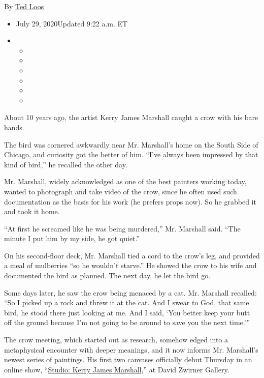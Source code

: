 By \href{https://www.nytimes.com/by/ted-loos}{Ted Loos}

\begin{itemize}
\item
  July 29, 2020Updated 9:22 a.m. ET
\item
  \begin{itemize}
  \item
  \item
  \item
  \item
  \item
  \item
  \end{itemize}
\end{itemize}

About 10 years ago, the artist Kerry James Marshall caught a crow with
his bare hands.

The bird was cornered awkwardly near Mr. Marshall's home on the South
Side of Chicago, and curiosity got the better of him. ``I've always been
impressed by that kind of bird,'' he recalled the other day.

Mr. Marshall, widely acknowledged as one of the best painters working
today, wanted to photograph and take video of the crow, since he often
used such documentation as the basis for his work (he prefers props
now). So he grabbed it and took it home.

``At first he screamed like he was being murdered,'' Mr. Marshall said.
``The minute I put him by my side, he got quiet.''

On his second-floor deck, Mr. Marshall tied a cord to the crow's leg,
and provided a meal of mulberries ``so he wouldn't starve.'' He showed
the crow to his wife and documented the bird as planned. The next day,
he let the bird go.

Some days later, he saw the crow being menaced by a cat. Mr. Marshall
recalled: ``So I picked up a rock and threw it at the cat. And I swear
to God, that same bird, he stood there just looking at me. And I said,
`You better keep your butt off the ground because I'm not going to be
around to save you the next time.'''

The crow meeting, which started out as research, somehow edged into a
metaphysical encounter with deeper meanings, and it now informs Mr.
Marshall's newest series of paintings. His first two canvases officially
debut Thursday in an online show,
``\href{https://www.davidzwirner.com/viewing-room/studio-kerry-james-marshall}{Studio:
Kerry James Marshall},'' at David Zwirner Gallery.

